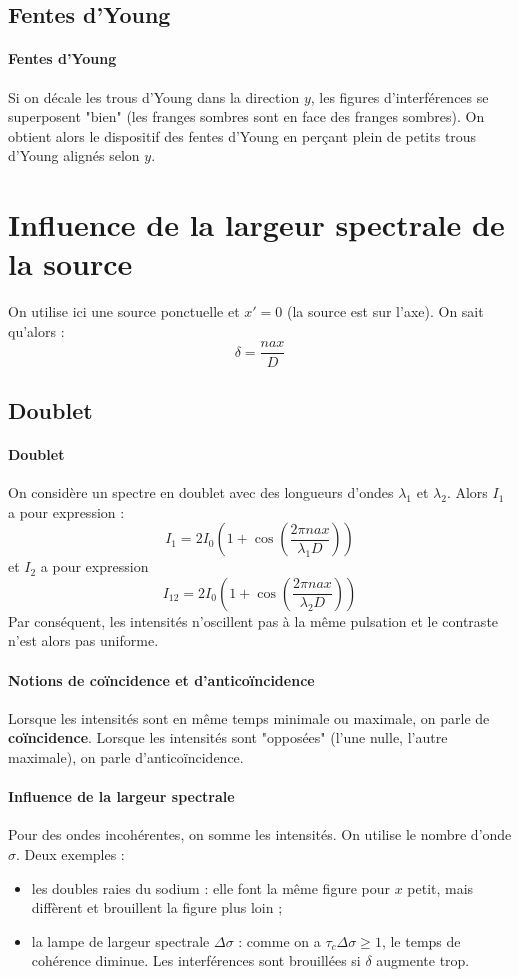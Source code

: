\documentclass[french]{book}
\theoremstyle{plain}
\theoremstyle{definition}
\theoremstyle{remark}
\begin{document}
\subsection{Fentes d'Young}
\paragraph{Fentes d'Young} Si on décale les trous d'Young dans la direction $y$, les figures d'interférences se superposent "bien" (les franges sombres sont en face des franges sombres). On obtient alors le dispositif des fentes d'Young en perçant plein de petits trous d'Young alignés selon $y$.
\section{Influence de la largeur spectrale de la source}
On utilise ici une source ponctuelle et $x'=0$ (la source est sur l'axe). On sait qu'alors : $$\delta=\frac{nax}{D}$$
\subsection{Doublet}
\paragraph{Doublet} On considère un spectre en doublet avec des longueurs d'ondes $\lambda_1$ et $\lambda_2$. Alors $I_1$ a pour expression : $$I_1=2I_0\left(1+\cos\left(\frac{2\pi nax}{\lambda_1 D}\right)\right)$$ et $I_2$ a pour expression $$I_12=2I_0\left(1+\cos\left(\frac{2\pi nax}{\lambda_2 D}\right)\right)$$ Par conséquent, les intensités n'oscillent pas à la même pulsation et le contraste n'est alors pas uniforme.
\paragraph{Notions de coïncidence et d'anticoïncidence} Lorsque les intensités sont en même temps minimale ou maximale, on parle de \textbf{coïncidence}. Lorsque les intensités sont "opposées" (l'une nulle, l'autre maximale), on parle d'anticoïncidence.
\paragraph{Influence de la largeur spectrale} Pour des ondes incohérentes, on somme les intensités. On utilise le nombre d'onde $\sigma$. Deux exemples : 
\begin{itemize}
	\item les doubles raies du sodium : elle font la même figure pour $x$ petit, mais diffèrent et brouillent la figure plus loin ;
	\item la lampe de largeur spectrale $\Delta\sigma$ : comme on a $\tau_c\Delta\sigma\geqslant1$, le temps de cohérence diminue. Les interférences sont brouillées si $\delta$ augmente trop.
\end{itemize}
\end{document}
